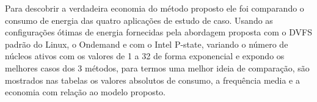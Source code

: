 Para descobrir a verdadeira economia do método proposto ele foi comparando o consumo de energia das quatro aplicações de estudo de caso. Usando as configurações ótimas de energia fornecidas pela abordagem proposta com o DVFS padrão do Linux, o Ondemand e com o Intel P-state, variando o número de núcleos ativos com os valores de 1 a 32 de forma exponencial e expondo os melhores casos dos 3 métodos, para termos uma melhor ideia de comparação, são mostrados nas tabelas os valores absolutos de consumo, a frequência media e a economia com relação ao modelo proposto.

\begin{table}[H]
\end{table}
